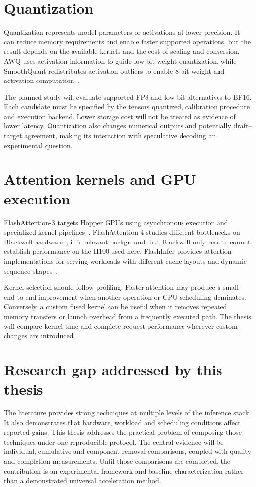 \section{Quantization}
Quantization represents model parameters or activations at lower precision. It can reduce memory requirements and enable faster supported operations, but the result depends on the available kernels and the cost of scaling and conversion. AWQ uses activation information to guide low-bit weight quantization, while SmoothQuant redistributes activation outliers to enable 8-bit weight-and-activation computation~\cite{awq,smoothquant}.

The planned study will evaluate supported FP8 and low-bit alternatives to BF16. Each candidate must be specified by the tensors quantized, calibration procedure and execution backend. Lower storage cost will not be treated as evidence of lower latency. Quantization also changes numerical outputs and potentially draft--target agreement, making its interaction with speculative decoding an experimental question.

\section{Attention kernels and GPU execution}
FlashAttention-3 targets Hopper GPUs using asynchronous execution and specialized kernel pipelines~\cite{fa3}. FlashAttention-4 studies different bottlenecks on Blackwell hardware~\cite{fa4}; it is relevant background, but Blackwell-only results cannot establish performance on the H100 used here. FlashInfer provides attention implementations for serving workloads with different cache layouts and dynamic sequence shapes~\cite{flashinfer}.

Kernel selection should follow profiling. Faster attention may produce a small end-to-end improvement when another operation or CPU scheduling dominates. Conversely, a custom fused kernel can be useful when it removes repeated memory transfers or launch overhead from a frequently executed path. The thesis will compare kernel time and complete-request performance wherever custom changes are introduced.

\section{Research gap addressed by this thesis}
The literature provides strong techniques at multiple levels of the inference stack. It also demonstrates that hardware, workload and scheduling conditions affect reported gains. This thesis addresses the practical problem of composing those techniques under one reproducible protocol. The central evidence will be individual, cumulative and component-removal comparisons, coupled with quality and completion measurements. Until those comparisons are completed, the contribution is an experimental framework and baseline characterization rather than a demonstrated universal acceleration method.
